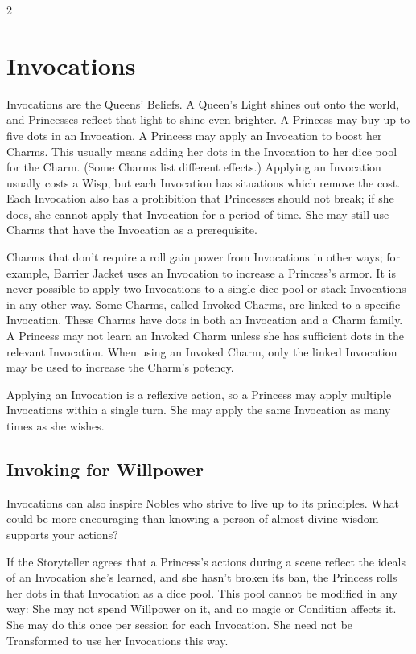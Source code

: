 \begin{multicols}{2}
\section*{Invocations}
\label{sec:Invocations}

Invocations are the Queens' Beliefs. A Queen's Light shines out onto the world, and Princesses reflect that light to shine even brighter. A Princess may buy up to five dots in an Invocation. A Princess may apply an Invocation to boost her Charms. This usually means adding her dots in the Invocation to her dice pool for the Charm. (Some Charms list different effects.) Applying an Invocation usually costs a Wisp, but each Invocation has situations which remove the cost. Each Invocation also has a prohibition that Princesses should not break; if she does, she cannot apply that Invocation for a period of time. She may still use Charms that have the Invocation as a prerequisite.

Charms that don't require a roll gain power from Invocations in other ways; for example, Barrier Jacket uses an Invocation to increase a Princess's armor. It is never possible to apply two Invocations to a single dice pool or stack Invocations in any other way. Some Charms, called Invoked Charms, are linked to a specific Invocation. These Charms have dots in both an Invocation and a Charm family. A Princess may not learn an Invoked Charm unless she has sufficient dots in the relevant Invocation. When using an Invoked Charm, only the linked Invocation may be used to increase the Charm's potency. 

Applying an Invocation is a reflexive action, so a Princess may apply multiple Invocations within a single turn. She may apply the same Invocation as many times as she wishes.

\subsection*{Invoking for Willpower}

Invocations can also inspire Nobles who strive to live up to its principles. What could be more encouraging than knowing a person of almost divine wisdom supports your actions? 

If the Storyteller agrees that a Princess's actions during a scene reflect the ideals of an Invocation she's learned, and she hasn’t broken its ban, the Princess rolls her dots in that Invocation as a dice pool. This pool cannot be modified in any way: She may not spend Willpower on it, and no magic or Condition affects it. She may do this once per session for each Invocation. She need not be Transformed to use her Invocations this way.
 

\end{multicols}
